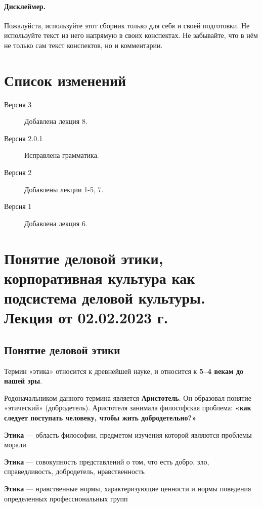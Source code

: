 \paragraph{Дисклеймер.} Пожалуйста, используйте этот сборник только для себя и своей подготовки. Не используйте текст из него напрямую в своих конспектах. Не забывайте, что в нём не только сам текст конспектов, но и комментарии.

\section*{Список изменений}
\begin{description}
    \item[Версия 3] Добавлена лекция 8.
    \item[Версия 2.0.1] Исправлена грамматика.
    \item[Версия 2] Добавлены лекции 1-5, 7.
    \item[Версия 1] Добавлена лекция 6. 
\end{description}

\clearpage

\tableofcontents
\clearpage

\section{Понятие деловой этики, корпоративная культура как подсистема деловой культуры. Лекция от 02.02.2023 г.}

\subsection{Понятие деловой этики}

Термин «этика» относится к древнейшей науке, и относится к \textbf{5–4 векам до нашей эры}.

Родоначальником данного термина является \textbf{Аристотель}. Он образовал понятие «этический» (добродетель). Аристотеля занимала философская проблема: \textbf{«как следует поступать человеку, чтобы жить добродетельно?»}

\begin{definition}
\textbf{Этика} — область философии, предметом изучения которой являются проблемы морали

\textbf{Этика} — совокупность представлений о том, что есть добро, зло, справедливость, добродетель, нравственность

\textbf{Этика} — нравственные нормы, характеризующие ценности и нормы поведения определенных профессиональных групп
\end{definition}

